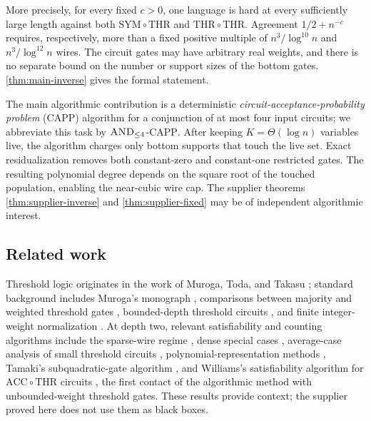 \documentclass[11pt,letterpaper]{article}
\newcommand{\cref}[1]{\ref{#1}}
\let\Cref\cref
\theoremstyle{definition}
\theoremstyle{remark}
\newcommand{\CAPP}{\textsc{CAPP}}
\newcommand{\ANDfour}{\textsc{AND}_{\le 4}}
\newcommand{\SYMTHR}{\mathrm{SYM}\circ\mathrm{THR}}
\newcommand{\THRTHR}{\mathrm{THR}\circ\mathrm{THR}}
\begin{document}
More precisely, for every fixed \(c>0\), one language is hard at every
sufficiently large length against both \(\SYMTHR\) and \(\THRTHR\). Agreement
\(1/2+n^{-c}\) requires, respectively, more than a fixed positive multiple of
\(n^3/\log^{10}n\) and \(n^3/\log^{12}n\) wires. The circuit gates may have
arbitrary real weights, and there is no separate bound on the number or
support sizes of the bottom gates. \Cref{thm:main-inverse} gives the formal
statement.

The main algorithmic contribution is a deterministic
\emph{circuit-acceptance-probability problem} (\CAPP) algorithm for a
conjunction of at most four input circuits; we abbreviate this task by
\(\ANDfour\)-\CAPP. After keeping \(K=\Theta(\log n)\) variables live, the
algorithm charges only bottom supports that touch the live set. Exact
residualization removes both constant-zero and constant-one restricted gates.
The resulting polynomial degree depends on the square root of the touched
population, enabling the near-cubic wire cap. The supplier theorems
\cref{thm:supplier-inverse} and \cref{thm:supplier-fixed} may be of independent
algorithmic interest.

\subsection{Related work}\label{sec:related-work}

Threshold logic originates in the work of Muroga, Toda, and Takasu
\cite{MTT61}; standard background includes Muroga's monograph \cite{Mur71},
comparisons between majority and weighted threshold gates \cite{HG91,GHR92},
bounded-depth threshold circuits \cite{HMPST93}, and finite integer-weight
normalization \cite{Has94}. At depth two, relevant satisfiability and counting
algorithms include the sparse-wire regime \cite{IPS13}, dense special cases
\cite{AS15}, average-case analysis of small threshold circuits \cite{CSS18},
polynomial-representation methods \cite{ACW16}, Tamaki's subquadratic-gate
algorithm \cite{Tam16}, and Williams's satisfiability algorithm for
\(\mathrm{ACC}\circ\mathrm{THR}\) circuits \cite{Wil14}, the first contact of
the algorithmic method with unbounded-weight threshold gates. These
results provide context; the supplier proved here
does not use them as black boxes.
\end{document}
